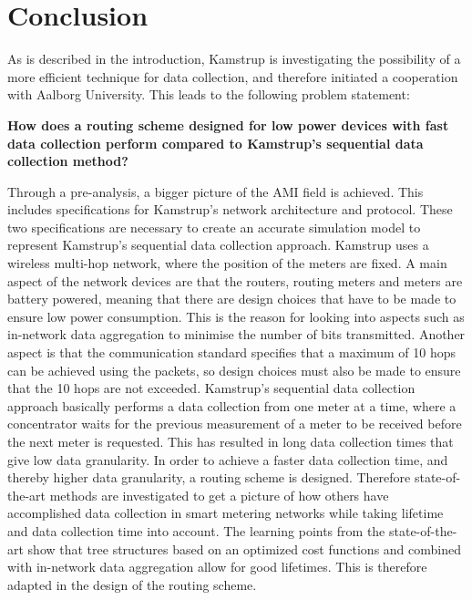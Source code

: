 \chapter{Conclusion}
\label{chap:conclusion}

As is described in the introduction, Kamstrup is investigating the possibility of a more efficient technique for data collection, and therefore initiated a cooperation with Aalborg University. This leads to the following problem statement:

\textbf{How does a routing scheme designed for low power devices with fast data collection perform compared to Kamstrup's sequential data collection method?}

Through a pre-analysis, a bigger picture of the AMI field is achieved. This includes specifications for Kamstrup's network architecture and protocol. These two specifications are necessary to create an accurate simulation model to represent Kamstrup's sequential data collection approach. Kamstrup uses a wireless multi-hop network, where the position of the meters are fixed. A main aspect of the network devices are that the routers, routing meters and meters are battery powered, meaning that there are design choices that have to be made to ensure low power consumption. This is the reason for looking into aspects such as in-network data aggregation to minimise the number of bits transmitted. Another aspect is that the communication standard specifies that a maximum of 10 hops can be achieved using the packets, so design choices must also be made to ensure that the 10 hops are not exceeded. Kamstrup's sequential data collection approach basically performs a data collection from one meter at a time, where a concentrator waits for the previous measurement of a meter to be received before the next meter is requested. This has resulted in long data collection times that give low data granularity. In order to achieve a faster data collection time, and thereby higher data granularity, a routing scheme is designed. Therefore state-of-the-art methods are investigated to get a picture of how others have accomplished data collection in smart metering networks while taking lifetime and data collection time into account. The learning points from the state-of-the-art show that tree structures based on an optimized cost functions and combined with in-network data aggregation allow for good lifetimes. This is therefore adapted in the design of the routing scheme.

